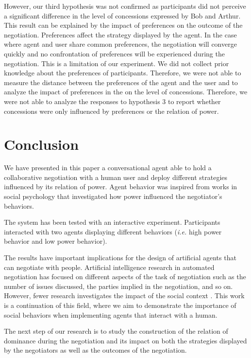 \documentclass[runningheads,a4paper]{llncs}
\begin{document}
		However, our third hypothesis was not confirmed as participants did not perceive a significant difference in the level of concessions expressed by Bob and Arthur. This result can be explained by the impact of preferences on the outcome of the negotiation. Preferences affect the strategy displayed by the agent. In the case where agent and user share common preferences, the negotiation will converge quickly and no confrontation of preferences will be experienced during the negotiation. This is a limitation of our experiment. We did not collect prior knowledge about the preferences of participants. Therefore, we were not able to measure the distance between the preferences of the agent and the user and to analyze the impact of preferences in the on the level of concessions.
		Therefore, we were not able to analyze the responses to hypothesis 3 to report whether concessions were only influenced by preferences or the relation of power.
		
		\section{Conclusion}
		
		We have presented in this paper a conversational agent able to hold a collaborative negotiation with a human user and deploy different strategies influenced by its relation of power. Agent behavior was inspired from works in social psychology that investigated how power influenced the negotiator's behaviors.
		
		 The system has been tested with an interactive experiment. Participants interacted with two agents displaying different behaviors (\textit{i.e.} high power behavior and low power behavior).
		 
		 The results have important implications for the design of artificial agents that can negotiate with people. Artificial intelligence research in automated negotiation has focused on different aspects of the task of negotiation such as the number of issues discussed, the parties implied in the negotiation, and so on. However, fewer research investigates the impact of the social context \cite{de2011effect,nazari2015opponent}. This work is a continuation of this field, where we aim to demonstrate the importance of social behaviors when implementing agents that interact with a human. %
		
		The next step of our research is to study the construction of the relation of dominance during the negotiation and its impact on both the strategies displayed by the negotiators as well as the outcomes of the negotiation.
		

\scriptsize{	
	
	}
\end{document}
